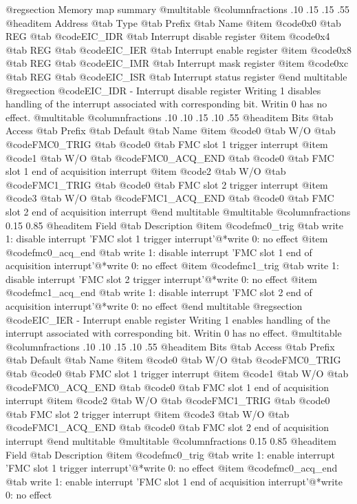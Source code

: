 @regsection Memory map summary
@multitable  @columnfractions .10 .15 .15 .55
@headitem Address @tab Type @tab Prefix @tab Name
@item @code{0x0} @tab
REG @tab
@code{EIC_IDR} @tab
Interrupt disable register
@item @code{0x4} @tab
REG @tab
@code{EIC_IER} @tab
Interrupt enable register
@item @code{0x8} @tab
REG @tab
@code{EIC_IMR} @tab
Interrupt mask register
@item @code{0xc} @tab
REG @tab
@code{EIC_ISR} @tab
Interrupt status register
@end multitable 
@regsection @code{EIC_IDR} - Interrupt disable register
Writing 1 disables handling of the interrupt associated with corresponding bit. Writin 0 has no effect.
@multitable @columnfractions .10 .10 .15 .10 .55
@headitem Bits @tab Access @tab Prefix @tab Default @tab Name
@item @code{0}
@tab W/O @tab
@code{FMC0_TRIG}
@tab @code{0} @tab 
FMC slot 1 trigger interrupt
@item @code{1}
@tab W/O @tab
@code{FMC0_ACQ_END}
@tab @code{0} @tab 
FMC slot 1 end of acquisition interrupt
@item @code{2}
@tab W/O @tab
@code{FMC1_TRIG}
@tab @code{0} @tab 
FMC slot 2 trigger interrupt
@item @code{3}
@tab W/O @tab
@code{FMC1_ACQ_END}
@tab @code{0} @tab 
FMC slot 2 end of acquisition interrupt
@end multitable
@multitable @columnfractions 0.15 0.85
@headitem Field @tab Description
@item @code{fmc0_trig} @tab write 1: disable interrupt 'FMC slot 1 trigger interrupt'@*write 0: no effect
@item @code{fmc0_acq_end} @tab write 1: disable interrupt 'FMC slot 1 end of acquisition interrupt'@*write 0: no effect
@item @code{fmc1_trig} @tab write 1: disable interrupt 'FMC slot 2 trigger interrupt'@*write 0: no effect
@item @code{fmc1_acq_end} @tab write 1: disable interrupt 'FMC slot 2 end of acquisition interrupt'@*write 0: no effect
@end multitable
@regsection @code{EIC_IER} - Interrupt enable register
Writing 1 enables handling of the interrupt associated with corresponding bit. Writin 0 has no effect.
@multitable @columnfractions .10 .10 .15 .10 .55
@headitem Bits @tab Access @tab Prefix @tab Default @tab Name
@item @code{0}
@tab W/O @tab
@code{FMC0_TRIG}
@tab @code{0} @tab 
FMC slot 1 trigger interrupt
@item @code{1}
@tab W/O @tab
@code{FMC0_ACQ_END}
@tab @code{0} @tab 
FMC slot 1 end of acquisition interrupt
@item @code{2}
@tab W/O @tab
@code{FMC1_TRIG}
@tab @code{0} @tab 
FMC slot 2 trigger interrupt
@item @code{3}
@tab W/O @tab
@code{FMC1_ACQ_END}
@tab @code{0} @tab 
FMC slot 2 end of acquisition interrupt
@end multitable
@multitable @columnfractions 0.15 0.85
@headitem Field @tab Description
@item @code{fmc0_trig} @tab write 1: enable interrupt 'FMC slot 1 trigger interrupt'@*write 0: no effect
@item @code{fmc0_acq_end} @tab write 1: enable interrupt 'FMC slot 1 end of acquisition interrupt'@*write 0: no effect
